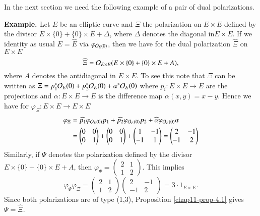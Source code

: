 In the next section we need the following example of a pair of dual polarizations.

\medskip
\noindent
{\bfseries {} Example. \label{chap11-Exam-4.2}} Let $E$ be an elliptic curve and $\Xi$ the polarization on $E\times E$ defined by the divisor $E \times \{0\} + \{0\} \times E + \Delta$, where $\Delta$ denotes the diagonal in\pageoriginale $E \times E$. If  we identity as usual $E =\hat{E}$ via $\varphi_{\mathcal{O}_{E}(0)}$, then we have for the dual polarization $\hat{\Xi}$ on $E \times E$
$$
\widehat{\Xi} = \mathcal{O}_{E \times E}(E \times \{0\} + \{0\} \times E +A),
$$
where $A$ denotes the antidiagonal in $E \times E$. To see this note that $\Xi$ can be written as $\Xi = p_{1}^{*}\mathcal{O}_{E}(0) + p_{2}^{*}\mathcal{O}_{E}(0) + \alpha^{*}\mathcal{O}_{E}(0)$ where $p_{i}: E \times E \rightarrow E $ are the projections and $\alpha : E \times E \rightarrow E$ is the difference map $\alpha(x,y) = x-y$. Hence we have
for $\varphi_{\Xi}: E \times E \rightarrow E \times E$
\begin{align*}
\varphi_{\Xi} &= \widehat{p_{1}}\varphi_{\mathcal{O}_{E} (0)}p_{1} + \widehat{p_{2}}\varphi_{\mathcal{O}_{E}(0)}p_{2} +
\widehat{\alpha}\varphi_{\mathcal{O}_{E}(0)}\alpha\\
 & =\begin{pmatrix}
0 & 0\\
0 & 1
\end{pmatrix}
+
\begin{pmatrix}
0 & 0\\
0 & 1
\end{pmatrix}
+
\begin{pmatrix}
1 & -1\\
-1 & 1
\end{pmatrix}
=
\begin{pmatrix}
2 & -1\\
-1 & 2
\end{pmatrix}
\end{align*}
Similarly, if $\Psi$ denotes the polarization defined by the divisor $E \times \{0\} + \{0\} \times E + A$, then 
$\varphi_{\Psi} = \begin{pmatrix}
2 & 1\\
1 & 2
\end{pmatrix}$.
This implies
$$
\varphi_{\Psi}\varphi_{\Xi} = \begin{pmatrix}
2 & 1\\
1 & 2
\end{pmatrix}
\begin{pmatrix}
2 & -1\\
-1 & 2
\end{pmatrix}
=3 \cdot 1_{E\times E}.
$$
Since both polarizations are of type (1,3), Proposition \ref{chap11-prop-4.1} gives $\Psi = \widehat{\Xi}$.

